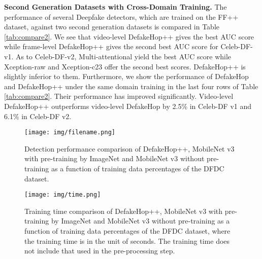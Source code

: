 \documentclass[main, biber]{now-journal}
\begin{document}
{\bf Second Generation Datasets with Cross-Domain Training.} The
performance of several Deepfake detectors, which are trained on the FF++
dataset, against two second generation datasets is compared in Table
\ref{tab:compare2}. We see that video-level DefakeHop++ gives the best
AUC score while frame-level DefakeHop++ gives the second best AUC score
for Celeb-DF-v1. As to Celeb-DF-v2, Multi-attentional yield the best AUC
score while Xception-raw and Xception-c23 offer the second best scores.
DefakeHop++ is slightly inferior to them. Furthermore, we show the
performance of DefakeHop and DefakeHop++ under the same domain training
in the last four rows of Table \ref{tab:compare2}. Their performance
has improved significantly. Video-level DefakeHop++ outperforms video-level 
DefakeHop by 2.5\% in Celeb-DF v1 and 6.1\% in Celeb-DF v2. 

\begin{figure}[!t]
\centering
\texttt{[image: img/filename.png]}
\caption{Detection performance comparison of DefakeHop++, MobileNet v3
with pre-training by ImageNet and MobileNet v3 without pre-training as a
function of training data percentages of the DFDC dataset.}\label{fig_weak}
\end{figure}

\begin{figure}[!b]
\centering
\texttt{[image: img/time.png]}
\caption{Training time comparison of DefakeHop++, MobileNet v3 with
pre-training by ImageNet and MobileNet v3 without pre-training as a
function of training data percentages of the DFDC dataset, where the
training time is in the unit of seconds. The training time does not
include that used in the pre-processing step.}\label{fig_time}
\end{figure}
\end{document}
